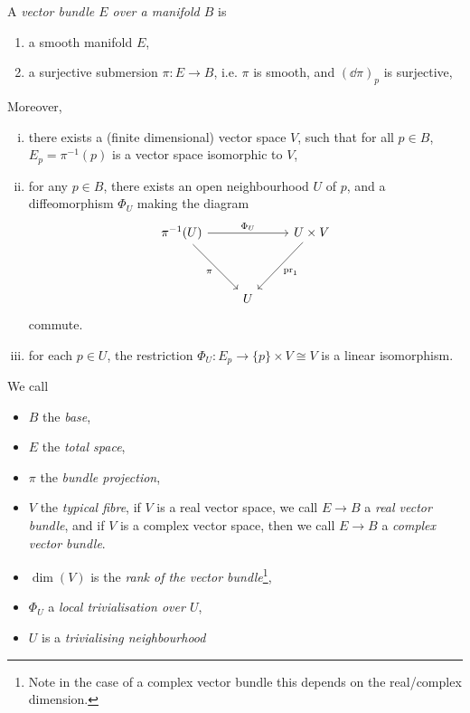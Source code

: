 \documentclass{article}
\begin{document}
\begin{definition}
     A \emph{vector bundle \(E\) over a manifold \(B\)} is
    \begin{enumerate}
        \item a smooth manifold \(E\),
        \item a surjective submersion \(\pi : E \to B\), i.e. \(\pi\) is smooth, and \((\dd\pi)_p\) is surjective,
    \end{enumerate}
    Moreover,
    \begin{enumerate}[(i)]
        \item there exists a (finite dimensional) vector space \(V\), such that for all \(p \in B\), \(E_p = \pi^{-1}(p)\) is a vector space isomorphic to \(V\),
        \item for any \(p \in B\), there exists an open neighbourhood \(U\) of \(p\), and a diffeomorphism \(\Phi_U\) making the diagram
        \[\begin{tikzcd}
            {\pi^{-1}(U)} && {U \times V} \\
            \\
            & U
            \arrow["{\Phi_U}", from=1-1, to=1-3]
            \arrow["\pi"', from=1-1, to=3-2]
            \arrow["{\pr_1}", from=1-3, to=3-2]
        \end{tikzcd}\]
        commute.
        \item for each \(p \in U\), the restriction \(\Phi_U : E_p \to \{p\} \times V \cong V\) is a linear isomorphism.
    \end{enumerate}

    We call 
    \begin{itemize}
        \item \(B\) the \emph{base}, 
        \item \(E\) the \emph{total space}, 
        \item \(\pi\) the \emph{bundle projection},
        \item \(V\) the \emph{typical fibre}, if \(V\) is a real vector space, we call \(E\to B\) a \emph{real vector bundle}, and if \(V\) is a complex vector space, then we call \(E \to B\) a \emph{complex vector bundle}.
        \item \(\dim(V)\) is the \emph{rank of the vector bundle}\footnote{Note in the case of a complex vector bundle this depends on the real/complex dimension.},
        \item \(\Phi_U\) a \emph{local trivialisation over \(U\)},
        \item \(U\) is a \emph{trivialising neighbourhood}
    \end{itemize}
\end{definition}
\end{document}
